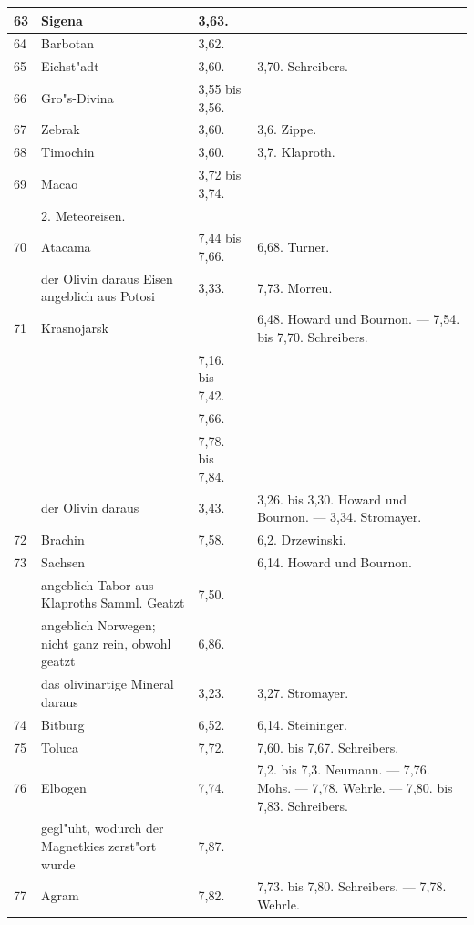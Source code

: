 \documentclass[a4paper, 11pt, oneside, polutonikogreek, german]{article}
\begin{document}
\begin{center}
\begin{longtable}{|p{7mm}|p{32mm}|p{30mm}|p{30mm}|}
        63 & Sigena & 3,63. &   \\ \hline
        64 & Barbotan & 3,62. &   \\ \hline
        65 & Eichst"adt & 3,60. & 3,70. Schreibers. \\ \hline
        66 & Gro"s-Divina & 3,55 bis 3,56. &   \\ \hline
        67 & Zebrak & 3,60. & 3,6. Zippe. \\ \hline
        68 & Timochin & 3,60. & 3,7. Klaproth. \\ \hline
        69 & Macao & 3,72 bis 3,74. &   \\ \hline
          & 2. Meteoreisen. &   &   \\ \hline
        70 & Atacama & 7,44 bis 7,66. & 6,68. Turner. \\ \hline
          & der Olivin daraus Eisen angeblich aus Potosi & 3,33. & 7,73. Morreu. \\ \hline
        71 & Krasnojarsk &   & 6,48. Howard und Bournon. --- 7,54. bis 7,70. Schreibers. \\ \hline
         ~ &   & 7,16. bis 7,42. &   \\ \hline
         ~ &   & 7,66. &   \\ \hline
         ~ &   & 7,78. bis 7,84. &   \\ \hline
        ~ & der Olivin daraus & 3,43. & 3,26. bis 3,30. Howard und Bournon. --- 3,34. Stromayer. \\ \hline
        72 & Brachin & 7,58. & 6,2. Drzewinski. \\ \hline
        73 & Sachsen &   & 6,14. Howard und Bournon. \\ \hline
         ~ & angeblich Tabor aus Klaproths Samml. Geatzt & 7,50. &   \\ \hline
         ~ & angeblich Norwegen; nicht ganz rein, obwohl geatzt & 6,86. &   \\ \hline
        ~  & das olivinartige Mineral daraus & 3,23. & 3,27. Stromayer. \\ \hline
        74 & Bitburg & 6,52. & 6,14. Steininger. \\ \hline
        75 & Toluca & 7,72. & 7,60. bis 7,67. Schreibers. \\ \hline
        76 & Elbogen & 7,74. & 7,2. bis 7,3. Neumann. --- 7,76. Mohs. --- 7,78. Wehrle. --- 7,80. bis 7,83. Schreibers. \\ \hline
         ~ & gegl"uht, wodurch der Magnetkies zerst"ort wurde & 7,87. & ~  \\ \hline
        77 & Agram & 7,82. & 7,73. bis 7,80. Schreibers. --- 7,78. Wehrle. \\ \hline

\end{longtable}
\end{center}
\end{document}
